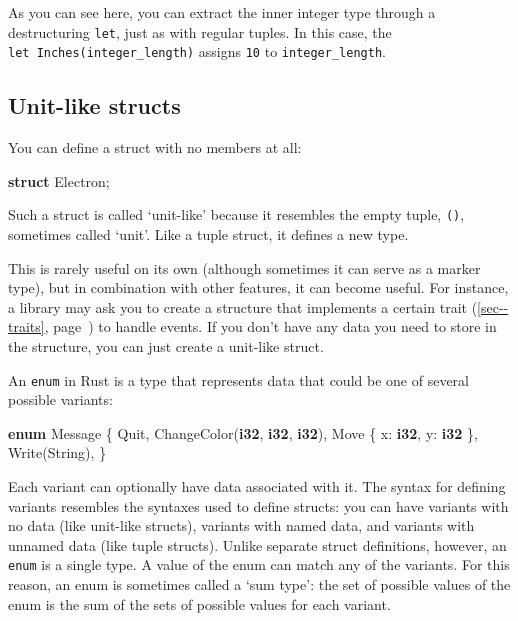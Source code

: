 \documentclass[a4paper,]{book}
\renewcommand*{\hyperref}[2][\ar]{%
  \def\ar{#2}%
  #2 (\autoref{#1}, page~\pageref{#1})}
\newenvironment{Shaded}{\begin{snugshade}}{\end{snugshade}}
\newcommand{\KeywordTok}[1]{\textcolor[rgb]{0.13,0.29,0.53}{\textbf{{#1}}}}
\newcommand{\NormalTok}[1]{{#1}}
\begin{document}
As you can see here, you can extract the inner integer type through a
destructuring \texttt{let}, just as with regular tuples. In this case,
the \texttt{let\ Inches(integer\_length)} assigns \texttt{10} to
\texttt{integer\_length}.

\subsection{Unit-like structs}\label{unit-like-structs}

You can define a struct with no members at all:

\begin{Shaded}
\begin{Highlighting}[]
\KeywordTok{struct} \NormalTok{Electron;}
\end{Highlighting}
\end{Shaded}

Such a struct is called `unit-like' because it resembles the empty
tuple, \texttt{()}, sometimes called `unit'. Like a tuple struct, it
defines a new type.

This is rarely useful on its own (although sometimes it can serve as a
marker type), but in combination with other features, it can become
useful. For instance, a library may ask you to create a structure that
implements a certain \hyperref[sec--traits]{trait} to handle events. If
you don't have any data you need to store in the structure, you can just
create a unit-like struct.


An \texttt{enum} in Rust is a type that represents data that could be
one of several possible variants:

\begin{Shaded}
\begin{Highlighting}[]
\KeywordTok{enum} \NormalTok{Message \{}
    \NormalTok{Quit,}
    \NormalTok{ChangeColor(}\KeywordTok{i32}\NormalTok{, }\KeywordTok{i32}\NormalTok{, }\KeywordTok{i32}\NormalTok{),}
    \NormalTok{Move \{ x: }\KeywordTok{i32}\NormalTok{, y: }\KeywordTok{i32} \NormalTok{\},}
    \NormalTok{Write(String),}
\NormalTok{\}}
\end{Highlighting}
\end{Shaded}

Each variant can optionally have data associated with it. The syntax for
defining variants resembles the syntaxes used to define structs: you can
have variants with no data (like unit-like structs), variants with named
data, and variants with unnamed data (like tuple structs). Unlike
separate struct definitions, however, an \texttt{enum} is a single type.
A value of the enum can match any of the variants. For this reason, an
enum is sometimes called a `sum type': the set of possible values of the
enum is the sum of the sets of possible values for each variant.
\end{document}
